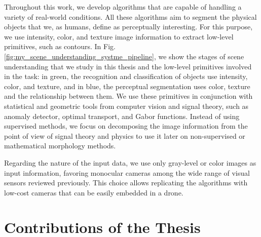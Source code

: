 Throughout this work, we develop algorithms that are capable of handling a variety of real-world conditions. All these algorithms aim to segment the physical objects that we, as humans, define as perceptually interesting. For this purpose, we use intensity, color, and texture image information to extract low-level primitives, such as contours. In Fig. \ref{fig:my_scene_understanding_systme_pipeline}, we show the stages of scene understanding that we study in this thesis and the low-level primitives involved in the task: in green, the recognition and classification of objects use intensity, color, and texture, and in blue, the perceptual segmentation uses color, texture and the relationship between them. We use these primitives in conjunction with statistical and geometric tools from computer vision and signal theory, such as anomaly detector, optimal transport, and Gabor functions. Instead of using supervised methods, we focus on decomposing the image information from the point of view of signal theory and physics to use it later on non-supervised or mathematical morphology methods.

Regarding the nature of the input data, we use only gray-level or color images as input information, favoring monocular cameras among the wide range of visual sensors reviewed previously. This choice allows replicating the algorithms with low-cost cameras that can be easily embedded in a drone.


\section*{Contributions of the Thesis}\label{sec:objectives_of_the_thesis}

